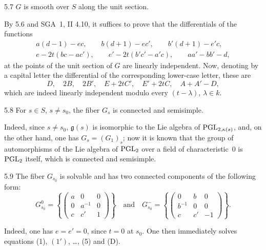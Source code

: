 \begin{lemma}{5.7}\label{XIX.5.7}
$G$ is smooth over $S$ along the unit section.
\end{lemma}
By 5.6 and SGA~1, II 4.10, it suffices to prove that the differentials of the functions
\[
\begin{gathered}
a(d-1)-ec,\qquad b(d+1)-ec',\qquad b'(d+1)-e'c,\\
e-2t(bc-ac'),\qquad e'-2t(b'c'-a'c),\qquad aa'-bb'-d,
\end{gathered}
\]
at the points of the unit section of $G$ are linearly independent. Now, denoting by a capital letter the differential of the corresponding lower-case letter, these are{\renewcommand{\thefootnote}{(40)}}
\[
D,\quad2B,\quad2B',\quad E+2tC',\quad E'+2tC,\quad A+A'-D,
\]
which are indeed linearly independent modulo every $(t-\lambda)$, $\lambda\in k$.{\renewcommand{\thefootnote}{(41)}}

\begin{lemma}{5.8}\label{XIX.5.8}
For $s\in S$, $s\ne s_0$, the fiber $G_s$ is connected and semisimple.
\end{lemma}
{\renewcommand{\thefootnote}{(42)}}%
Indeed, since $s\ne s_0$, $\mathfrak g(s)$ is isomorphic to the Lie algebra of $\operatorname{PGL}_{2,\kappa(s)}$, and, on the other hand, one has $G_s=(G_1)_s$; now it is known that the group of automorphisms of the Lie algebra of $\operatorname{PGL}_2$ over a field of characteristic~0 is $\operatorname{PGL}_2$ itself, which is connected and semisimple.

\begin{lemma}{5.9}\label{XIX.5.9}
The fiber $G_{s_0}$ is solvable and has two connected components of the following form:
\[
G_{s_0}^0=\left\{\begin{pmatrix}a&0&0\\0&a^{-1}&0\\c&c'&1\end{pmatrix}\right\}
\quad\text{and}\quad
G_{s_0}^-=\left\{\begin{pmatrix}0&b&0\\b^{-1}&0&0\\c&c'&-1\end{pmatrix}\right\}.
\]
\end{lemma}
Indeed, one has $e=e'=0$, since $t=0$ at $s_0$. One then immediately solves equations (1), $(1')$, \ldots, (5) and (D).


